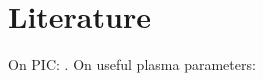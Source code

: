 \documentclass{aa}
\begin{document}

\section{Literature}\label{sect:summary}

On PIC: \citet{birdsall1985}.
On useful plasma parameters: \citet{Melzani_2014}







\end{document}
